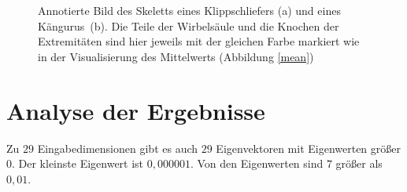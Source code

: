  \begin{figure}[ht]
  \qquad
  
  \caption{Annotierte Bild des Skeletts eines Klippschliefers (a) und eines \mbox{Kängurus (b)}. Die Teile der Wirbelsäule und die Knochen der Extremitäten sind hier jeweils mit der gleichen Farbe markiert wie in der Visualisierung des Mittelwerts (Abbildung \ref{mean})}
 \end{figure}
 

 \section{Analyse der Ergebnisse}
 \label{section_pca_result_analysis}
 
 Zu $29$ Eingabedimensionen gibt es auch $29$ Eigenvektoren mit Eigenwerten größer $0$. Der kleinste Eigenwert ist $0{,}000001$. Von den Eigenwerten sind $7$ größer als $0{,}01$. 
 
